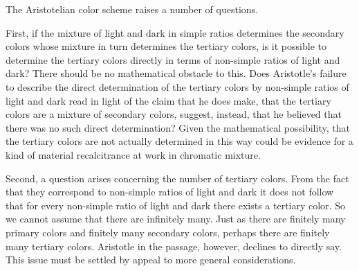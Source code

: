 The Aristotelian color scheme raises a number of questions.

First, if the mixture of light and dark in simple ratios determines the secondary colors whose mixture in turn determines the tertiary colors, is it possible to determine the tertiary colors directly in terms of non-simple ratios of light and dark? There should be no mathematical obstacle to this. Does Aristotle's failure to describe the direct determination of the tertiary colors by non-simple ratios of light and dark read in light of the claim that he does make, that the tertiary colors are a mixture of secondary colors, suggest, instead, that he believed that there was no such direct determination? Given the mathematical possibility, that the tertiary colors are not actually determined in this way could be evidence for a kind of material recalcitrance at work in chromatic mixture.

Second, a question arises concerning the number of tertiary colors. From the fact that they correspond to non-simple ratios of light and dark it does not follow that for every non-simple ratio of light and dark there exists a tertiary color. So we cannot assume that there are infinitely many. Just as there are finitely many primary colors and finitely many secondary colors, perhaps there are finitely many tertiary colors. Aristotle in the passage, however, declines to directly say. This issue must be settled by appeal to more general considerations.

